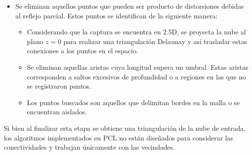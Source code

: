 \begin{itemize}
	\item Se eliminan aquellos puntos que pueden ser producto de distorsiones debidas al reflejo parcial.
		Estos puntos se identifican de la siguiente manera:
		\begin{itemize}
			\item Considerando que la captura se encuentra en 2.5D,
				se proyecta la nube al plano $z=0$ para realizar una triangulación Delaunay y así
				trasladar estas conexiones a los puntos en el espacio.
			\item Se eliminan aquellas aristas cuya longitud supera un umbral.
				Estas aristas corresponden a saltos excesivos de profundidad
				o a regiones en las que no se registraron puntos.
			\item Los puntos buscados son aquellos que delimitan bordes en la malla o se encuentran aislados.
		\end{itemize}
\end{itemize}

Si bien al finalizar esta etapa se obtiene una triangulación de la nube de entrada,
los algoritmos implementados en PCL no están diseñados para considerar las conectividades y trabajan únicamente con las vecindades.


